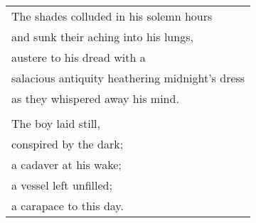 \documentclass{article}
\begin{document}
\begin{center}
\begin{tabular}{l}
The shades colluded in his solemn hours \\
and sunk their aching into his lungs, \\
austere to his dread with a \\
salacious antiquity heathering midnight's dress \\
as they whispered away his mind. \\
\\
The boy laid still, \\
conspired by the dark; \\
a cadaver at his wake; \\
a vessel left unfilled; \\
a carapace to this day. \\
\end{tabular}
\end{center}
\end{document}
